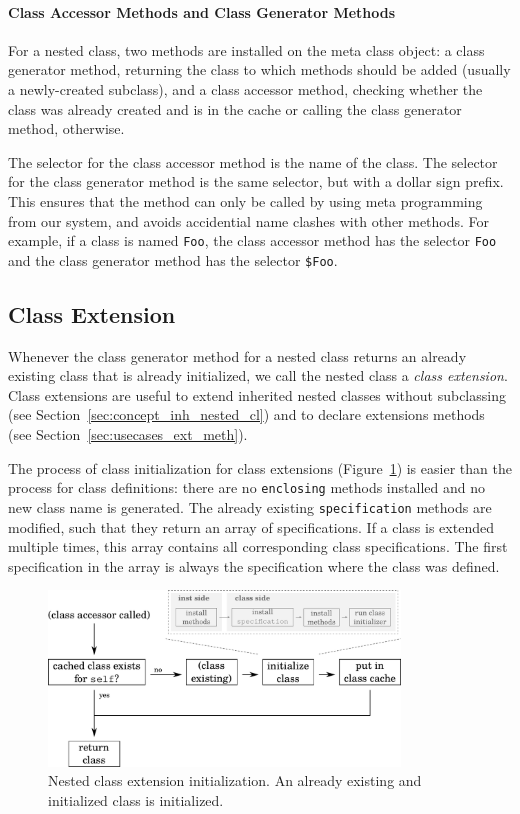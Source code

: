 \paragraph{Class Accessor Methods and Class Generator Methods}
For a nested class, two methods are installed on the meta class object: a class generator method, returning the class to which methods should be added (usually a newly-created subclass), and a class accessor method, checking whether the class was already created and is in the cache or calling the class generator method, otherwise.

The selector for the class accessor method is the name of the class. The selector for the class generator method is the same selector, but with a dollar sign prefix. This ensures that the method can only be called by using meta programming from our system, and avoids accidential name clashes with other methods. For example, if a class is named \texttt{Foo}, the class accessor method has the selector \texttt{Foo} and the class generator method has the selector \texttt{\$Foo}.

\subsection{Class Extension}
\label{sec:impl_class_ext_subsec}
Whenever the class generator method for a nested class returns an already existing class that is already initialized, we call the nested class a \emph{class extension}. Class extensions are useful to extend inherited nested classes without subclassing (see Section~\ref{sec:concept_inh_nested_cl}) and to declare extensions methods (see Section~\ref{sec:usecases_ext_meth}). 

The process of class initialization for class extensions (Figure~\ref{fig:lazy_class_gen_ext}) is easier than the process for class definitions: there are no \texttt{enclosing} methods installed and no new class name is generated. The already existing \texttt{specification} methods are modified, such that they return an array of specifications. If a class is extended multiple times, this array contains all corresponding class specifications. The first specification in the array is always the specification where the class was defined.

\begin{figure}[!htp]
	\includegraphics[width=0.8314\textwidth]{lazy_class_gen_ext.pdf}
	\centering
	\caption[Nested class extension initialization]{Nested class extension initialization. An already existing and initialized class is initialized.}
	\label{fig:lazy_class_gen_ext}
\end{figure}

